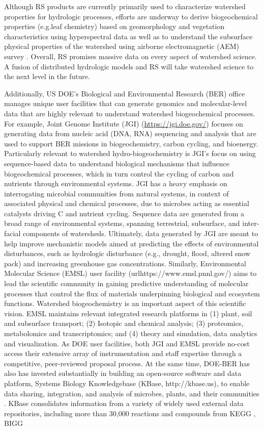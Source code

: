 \documentclass[preprint,review, 12pt]{elsarticle}
\begin{document}
Although RS products are currently primarily used to characterize watershed properties for hydrologic processes, efforts are underway to derive biogeochemical properties (e.g.leaf chemistry) based on geomorphology and vegetation characteristics using hyperspectral data \cite{falco2019investigating} as well as to understand the subsurface physical properties of the watershed using  airborne electromagnetic (AEM) survey \cite{Hubbard2018}. Overall, RS promises massive data on every aspect of watershed science. A fusion of distributed hydrologic models and RS will take watershed science to the next level in the future.
            
Additionally, US DOE's Biological and Environmental Research (BER) office manages unique user facilities that can generate genomics and molecular-level data that are highly relevant to understand watershed biogeochemical processes. For example, Joint Genome Institute (JGI) (\url{https://jgi.doe.gov/}) focuses on generating data from nucleic acid (DNA, RNA) sequencing and analysis that are used to support BER missions in biogeochemistry, carbon cycling, and bioenergy. Particularly relevant to watershed hydro-biogeochemistry is JGI's focus on using sequence-based data to understand biological mechanisms that influence biogeochemical processes, which in turn control the cycling of carbon and nutrients through environmental systems. JGI has a heavy emphasis on interrogating microbial communities from natural systems, in context of associated physical and chemical processes, due to microbes acting as essential catalysts driving C and nutrient cycling. Sequence data are generated from a broad range of environmental systems, spanning terrestrial, subsurface, and inter-facial components of watersheds. Ultimately, data generated by JGI are meant to help improve mechanistic models aimed at predicting the effects of environmental disturbances, such as hydrologic disturbance (e.g., drought, flood, altered snow pack) and increasing greenhouse gas concentrations. Similarly, Environmental Molecular Science (EMSL) user facility (url{https://www.emsl.pnnl.gov/}) aims to lead the scientific community in gaining predictive understanding of molecular processes that control the flux of materials underpinning biological and ecosystem functions. Watershed biogeochemistry is an important aspect of this scientific vision. EMSL maintains relevant integrated research platforms in (1) plant, soil and subsurface transport; (2) Isotopic and chemical analysis; (3) proteomics, metabolomics and transcriptomics; and (4) theory and simulation, data analytics and visualization. As DOE user facilities, both JGI and EMSL provide no-cost access their extensive array of instrumentation and staff expertise through a competitive, peer-reviewed proposal process. At the same time, DOE-BER has also has invested substantially in building an open-source software and data platform, Systems Biology Knowledgebase (KBase, http://kbase.us), to enable data sharing, integration, and analysis of microbes, plants, and their communities \citep{Arkin2018}. KBase consolidates information from a variety of widely used external data repositories, including more than 30,000 reactions and compounds from KEGG \citep{Kanehisa2000}, BIGG 
\end{document}
